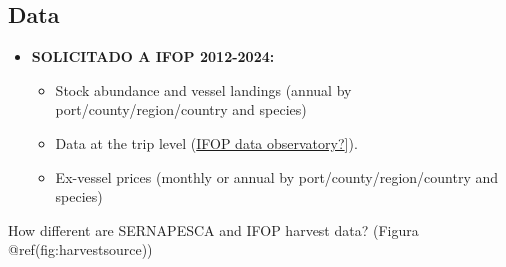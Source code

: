 \hypertarget{data}{%
\subsection{Data}\label{data}}

\begin{itemize}
\tightlist
\item
  \textbf{SOLICITADO A IFOP 2012-2024:}

  \begin{itemize}
  \tightlist
  \item
    Stock abundance and vessel landings (annual by
    port/county/region/country and species)
  \item
    Data at the trip level (\href{ifop.dataobservatory.net}{IFOP data
    observatory?}{]}).
  \item
    Ex-vessel prices (monthly or annual by port/county/region/country
    and species)
  \end{itemize}
\end{itemize}

How different are SERNAPESCA and IFOP harvest data? (Figura
@ref(fig:harvestsource))

